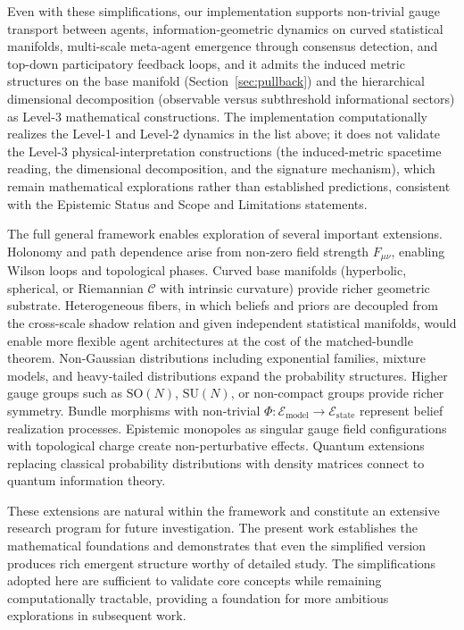 \documentclass[11pt]{article}
\begin{document}
Even with these simplifications, our implementation supports non-trivial gauge transport between agents, information-geometric dynamics on curved statistical manifolds, multi-scale meta-agent emergence through consensus detection, and top-down participatory feedback loops, and it admits the induced metric structures on the base manifold (Section~\ref{sec:pullback}) and the hierarchical dimensional decomposition (observable versus subthreshold informational sectors) as Level-3 mathematical constructions. The implementation computationally realizes the Level-1 and Level-2 dynamics in the list above; it does not validate the Level-3 physical-interpretation constructions (the induced-metric spacetime reading, the dimensional decomposition, and the signature mechanism), which remain mathematical explorations rather than established predictions, consistent with the Epistemic Status and Scope and Limitations statements.

The full general framework enables exploration of several important extensions. Holonomy and path dependence arise from non-zero field strength $F_{\mu\nu}$, enabling Wilson loops and topological phases. Curved base manifolds (hyperbolic, spherical, or Riemannian $\mathcal{C}$ with intrinsic curvature) provide richer geometric substrate. Heterogeneous fibers, in which beliefs and priors are decoupled from the cross-scale shadow relation and given independent statistical manifolds, would enable more flexible agent architectures at the cost of the matched-bundle theorem. Non-Gaussian distributions including exponential families, mixture models, and heavy-tailed distributions expand the probability structures. Higher gauge groups such as $\mathrm{SO}(N)$, $\mathrm{SU}(N)$, or non-compact groups provide richer symmetry. Bundle morphisms with non-trivial $\Phi: \mathcal{E}_{\mathrm{model}} \to \mathcal{E}_{\mathrm{state}}$ represent belief realization processes. Epistemic monopoles as singular gauge field configurations with topological charge create non-perturbative effects. Quantum extensions replacing classical probability distributions with density matrices connect to quantum information theory.

These extensions are natural within the framework and constitute an extensive research program for future investigation. The present work establishes the mathematical foundations and demonstrates that even the simplified version produces rich emergent structure worthy of detailed study. The simplifications adopted here are sufficient to validate core concepts while remaining computationally tractable, providing a foundation for more ambitious explorations in subsequent work.
\end{document}
